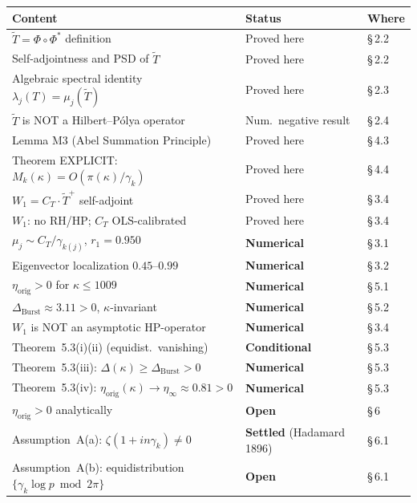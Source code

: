 \documentclass[11pt]{article}
\newcommand{\etaorig}{\eta_{\mathrm{orig}}}
\newcommand{\Tt}{\widetilde{T}}
\newcommand{\CT}{C_{T}}
\newcommand{\Wone}{W_1}
\newcommand{\Dburstvar}{\Delta_{\mathrm{Burst}}}
\begin{document}
\begin{center}
\renewcommand{\arraystretch}{1.3}
\begin{tabular}{lll}
\toprule
Content & Status & Where \\
\midrule
$\Tt = \Phi\circ\Phi^*$ definition & Proved here & \S\,2.2 \\
Self-adjointness and PSD of $\Tt$ & Proved here & \S\,2.2 \\
Algebraic spectral identity $\lambda_j(T)=\mu_j(\Tt)$ & Proved here & \S\,2.3 \\
$\Tt$ is NOT a Hilbert--P\'olya operator & Num.\ negative result & \S\,2.4 \\
Lemma M3 (Abel Summation Principle) & Proved here & \S\,4.3 \\
Theorem EXPLICIT: $M_k(\kappa)=O(\pi(\kappa)/\gamma_k)$ & Proved here & \S\,4.4 \\
$\Wone = \CT\cdot\Tt^+$ self-adjoint & Proved here & \S\,3.4 \\
$\Wone$: no RH/HP; $\CT$ OLS-calibrated & Proved here & \S\,3.4 \\
$\mu_j \sim \CT/\gamma_{k(j)}$, $r_1=0.950$ & \textbf{Numerical} & \S\,3.1 \\
Eigenvector localization $0.45$--$0.99$ & \textbf{Numerical} & \S\,3.2 \\
$\etaorig > 0$ for $\kappa\leq 1009$ & \textbf{Numerical} & \S\,5.1 \\
$\Dburstvar \approx 3.11 > 0$, $\kappa$-invariant & \textbf{Numerical} & \S\,5.2 \\
$\Wone$ is NOT an asymptotic HP-operator & \textbf{Numerical} & \S\,3.4 \\
Theorem~5.3(i)(ii) (equidist.\ vanishing) & \textbf{Conditional} & \S\,5.3 \\
Theorem~5.3(iii): $\Delta(\kappa)\geq\Dburstvar > 0$
  & \textbf{Numerical} & \S\,5.3 \\
Theorem~5.3(iv): $\etaorig(\kappa)\to\eta_\infty\approx 0.81 > 0$
  & \textbf{Numerical} & \S\,5.3 \\
$\etaorig > 0$ analytically & \textbf{Open} & \S\,6 \\
Assumption~A(a): $\zeta(1+in\gamma_k)\neq 0$
  & \textbf{Settled} (Hadamard 1896) & \S\,6.1 \\
Assumption~A(b): equidistribution $\{\gamma_k\log p\bmod 2\pi\}$
  & \textbf{Open} & \S\,6.1 \\
\bottomrule
\end{tabular}
\end{center}
\end{document}
